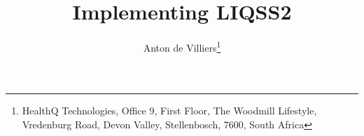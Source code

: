\documentclass[10pt]{article}
\title{Implementing LIQSS2}
\author{Anton de Villiers\thanks{HealthQ Technologies, Office 9, First Floor, The Woodmill Lifestyle, Vredenburg Road, Devon Valley,
Stellenbosch, 7600, South Africa}}
\begin{document}
\setcounter{page}{1}



\newcommand{\blokkie}{\hspace{.07cm}\Box\hspace{.07cm}}

\newcommand{\headcol}{\rowcolor{tableheadcolor}}
\newcommand{\rowcol}{\rowcolor{tablerowcolor}}

\newcommand{\topline}{\arrayrulecolor{black}\specialrule{0.1em}{\abovetopsep}{0pt}%
	\arrayrulecolor{tableheadcolor}\specialrule{\belowrulesep}{0pt}{0pt}%
	\arrayrulecolor{black}}

\newcommand{\toplinee}{\arrayrulecolor{black}\specialrule{0.1em}{\abovetopsep}{0pt}%
	\arrayrulecolor{tablerowcolor}\specialrule{\belowrulesep}{0pt}{0pt}%
	\arrayrulecolor{black}}

\newcommand{\midline}{\arrayrulecolor{tableheadcolor}\specialrule{\aboverulesep}{0pt}{0pt}%
	\arrayrulecolor{black}\specialrule{\lightrulewidth}{0pt}{0pt}%
	\arrayrulecolor{white}\specialrule{\belowrulesep}{0pt}{0pt}%
	\arrayrulecolor{black}}

\newcommand{\midlinecbw}{\arrayrulecolor{tablerowcolor}\specialrule{\aboverulesep}{0pt}{0pt}%
	\arrayrulecolor{black}\specialrule{\lightrulewidth}{0pt}{0pt}%
 	\arrayrulecolor{white}\specialrule{\belowrulesep}{0pt}{0pt}%
	\arrayrulecolor{black}}

\newcommand{\midlinecw}{\arrayrulecolor{tablerowcolor}\specialrule{\aboverulesep}{0pt}{0pt}%
	\arrayrulecolor{tablerowcolor}\specialrule{\lightrulewidth}{0pt}{0pt}%
	\arrayrulecolor{white}\specialrule{\belowrulesep}{0pt}{0pt}%
	\arrayrulecolor{black}}

\newcommand{\midlinewbc}{\arrayrulecolor{white}\specialrule{\aboverulesep}{0pt}{0pt}%
	\arrayrulecolor{black}\specialrule{\lightrulewidth}{0pt}{0pt}%
	\arrayrulecolor{tablerowcolor}\specialrule{\belowrulesep}{0pt}{0pt}%
	\arrayrulecolor{black}}

\newcommand{\midlinehr}{\arrayrulecolor{tablerowcolor}\specialrule{\aboverulesep}{0pt}{0pt}%
	\arrayrulecolor{black}\specialrule{\lightrulewidth}{0pt}{0pt}%
	\arrayrulecolor{tableheadcolor}\specialrule{\belowrulesep}{0pt}{0pt}%
	\arrayrulecolor{tablerowcolor}}
\end{document}
